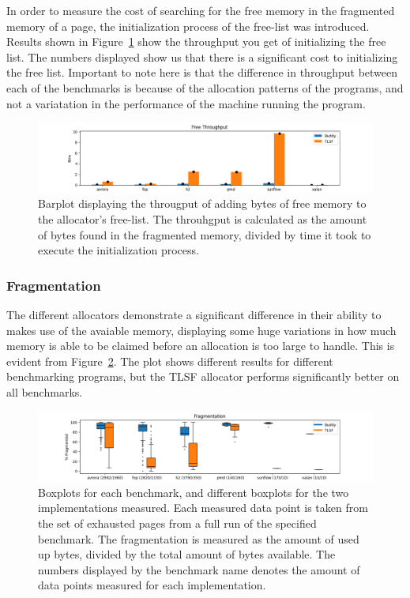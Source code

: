 In order to measure the cost of searching for the free memory in the fragmented memory of a page, the initialization process of the free-list was introduced. Results shown in Figure~\ref{fig:free-list-initialization} show the throughput you get of initializing the free list. The numbers displayed show us that there is a significant cost to initializing the free list. Important to note here is that the difference in throughput between each of the benchmarks is because of the allocation patterns of the programs, and not a variatation in the performance of the machine running the program. 

\begin{figure}[H]
\centering
\includegraphics[width=1\textwidth]{figures/free_throughput.png}
\caption{Barplot displaying the througput of adding bytes of free memory to the allocator's free-list. The throuhgput is calculated as the amount of bytes found in the fragmented memory, divided by time it took to execute the initialization process.}
\label{fig:free-list-initialization}
\end{figure}

\subsubsection{Fragmentation}
The different allocators demonstrate a significant difference in their ability to makes use of the avaiable memory, displaying some huge variations in how much memory is able to be claimed before an allocation is too large to handle. This is evident from Figure~\ref*{fig:memory-fragmentation}. The plot shows different results for different benchmarking programs, but the TLSF allocator performs significantly better on all benchmarks.

\begin{figure}[H]
\centering
\includegraphics[width=1\textwidth]{figures/fl_fragmentation.png}
\caption{Boxplots for each benchmark, and different boxplots for the two implementations measured. Each measured data point is taken from the set of exhausted pages from a full run of the specified benchmark. The fragmentation is measured as the amount of used up bytes, divided by the total amount of bytes available. The numbers displayed by the benchmark name denotes the amount of data points measured for each implementation.}
\label{fig:memory-fragmentation}
\end{figure}

